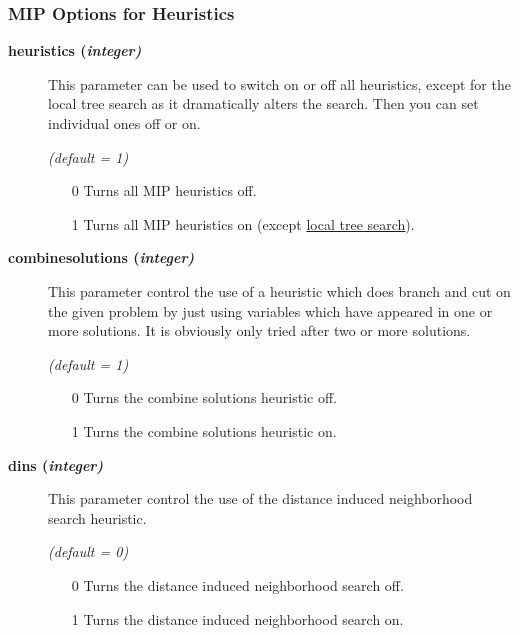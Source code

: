 \subsubsection{MIP Options for Heuristics}

\begin{description}

\item[\label{heuristics}\hypertarget{heuristics}
{\textbf{heuristics (\slshape{integer})}}]\hspace{1.0in}

This parameter can be used to switch on or off all heuristics, except for the local tree search as it dramatically alters the search.
Then you can set individual ones off or on.

\textsl{(default = 1)}
\begin{itemize}
\item[0] 
Turns all MIP heuristics off.
\item[1] 
Turns all MIP heuristics on (except \hyperlink{localtreesearch}{local tree search}).
\end{itemize}

\item[\label{combinesolutions}\hypertarget{combinesolutions}
{\textbf{combinesolutions (\slshape{integer})}}]\hspace{1.0in}

This parameter control the use of a heuristic which does branch and cut on the given problem by just using variables which have appeared in one or more solutions.
It is obviously only tried after two or more solutions.

\textsl{(default = 1)}
\begin{itemize}
\item[0] 
Turns the combine solutions heuristic off.
\item[1] 
Turns the combine solutions heuristic on.
\end{itemize}

\item[\label{dins}\hypertarget{dins}
{\textbf{dins (\slshape{integer})}}]\hspace{1.0in}

This parameter control the use of the distance induced neighborhood search heuristic.

\textsl{(default = 0)}
\begin{itemize}
\item[0] 
Turns the distance induced neighborhood search off.
\item[1] 
Turns the distance induced neighborhood search on.
\end{itemize}


\end{description}
